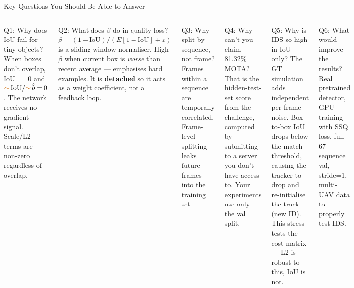 \documentclass[aspectratio=169, 10pt]{beamer}
\newcommand{\partial}{\textcolor{orange!80!black}{\textbf{$\sim$}}}
\begin{document}
\begin{frame}{Key Questions You Should Be Able to Answer}

  \begin{columns}[T]


    \begin{block}{Q1: Why does IoU fail for tiny objects?}
      When boxes don't overlap, IoU~$=0$ and $\partial\,\text{IoU}/\partial\,\hat{b} = 0$.
      The network receives no gradient signal.
      Scale/L2 terms are non-zero regardless of overlap.
    \end{block}

    \vspace{0.4em}
    \begin{block}{Q2: What does $\beta$ do in quality loss?}
      $\beta = (1-\text{IoU}) / (E[1-\text{IoU}]+\varepsilon)$ is a sliding-window
      normaliser.  High $\beta$ when current box is \emph{worse} than recent average —
      emphasises hard examples.
      It is \textbf{detached} so it acts as a weight coefficient, not a feedback loop.
    \end{block}

    \vspace{0.4em}
    \begin{block}{Q3: Why split by sequence, not frame?}
      Frames within a sequence are temporally correlated.
      Frame-level splitting leaks future frames into the training set.
    \end{block}


    \begin{block}{Q4: Why can't you claim 81.32\% MOTA?}
      That is the hidden-test-set score from the challenge,
      computed by submitting to a server you don't have access to.
      Your experiments use only the val split.
    \end{block}

    \vspace{0.4em}
    \begin{block}{Q5: Why is IDS so high in IoU-only?}
      The GT simulation adds independent per-frame noise.
      Box-to-box IoU drops below the match threshold, causing the tracker
      to drop and re-initialise the track (new ID).
      This stress-tests the cost matrix — L2 is robust to this, IoU is not.
    \end{block}

    \vspace{0.4em}
    \begin{block}{Q6: What would improve the results?}
      Real pretrained detector, GPU training with SSQ loss, full 67-sequence val,
      stride=1, multi-UAV data to properly test IDS.
    \end{block}

  \end{columns}
\end{frame}
\end{document}
